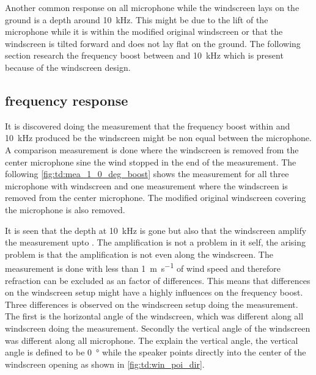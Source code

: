 Another common response on all microphone while the windscreen lays on the ground is a depth around \SI{10}{\kilo\hertz}. This might be due to the lift of the microphone while it is within the modified original windscreen or that the windscreen is tilted forward and does not lay flat on the ground. The following section research the frequency boost between  and \SI{10}{\kilo\hertz} which is present because of the windscreen design. 

\subsection{frequency response}\label{sec:des:freq_boost}
It is discovered doing the measurement that the frequency boost within  and \SI{10}{\kilo\hertz} produced be the windscreen might be non equal between the microphone. A comparison measurement is done where the windscreen is removed from the center microphone sine the wind stopped in the end of the measurement. The following \autoref{fig:td:mea_1_0_deg_boost} shows the measurement for all three microphone with windscreen and one measurement where the windscreen is removed from the center microphone. The modified original windscreen covering the microphone is also removed.  


It is seen that the depth at \SI{10}{\kilo\hertz} is gone but also that the windscreen amplify the measurement upto . The amplification is not a problem in it self, the arising problem is that the amplification is not even along the windscreen. The measurement is done with less than \SI{1}{\meter\per\second} of wind speed and therefore refraction can be excluded as an factor of differences. This means that differences on the windscreen setup might have a highly influences on the frequency boost. Three differences is observed on the windscreen setup doing the measurement. The first is the horizontal angle of the windscreen, which was different along all windscreen doing the measurement. Secondly the vertical angle of the windscreen was different along all microphone. The explain the vertical angle, the vertical angle is defined to be \SI{0}{\degree} while the speaker points directly into the center of the windscreen opening as shown in \autoref{fig:td:win_poi_dir}.


